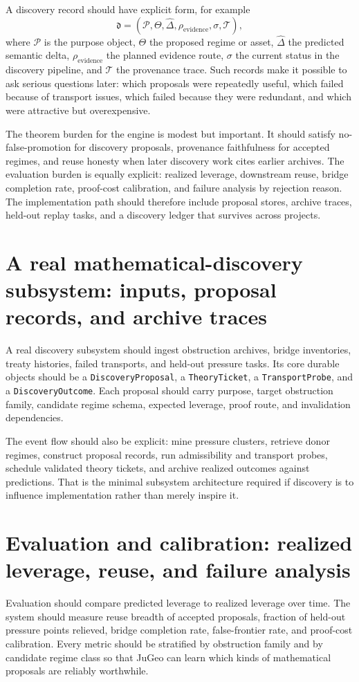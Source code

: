 \documentclass[11pt]{report}
\begin{document}
A discovery record should have explicit form, for example
\[
\mathfrak{d} = (\mathcal{P}, \Theta, \hat{\Delta}, \rho_{\mathrm{evidence}}, \sigma, \mathcal{T}),
\]
where $\mathcal{P}$ is the purpose object, $\Theta$ the proposed regime or asset, $\hat{\Delta}$ the predicted semantic delta, $\rho_{\mathrm{evidence}}$ the planned evidence route, $\sigma$ the current status in the discovery pipeline, and $\mathcal{T}$ the provenance trace. Such records make it possible to ask serious questions later: which proposals were repeatedly useful, which failed because of transport issues, which failed because they were redundant, and which were attractive but overexpensive.

The theorem burden for the engine is modest but important. It should satisfy no-false-promotion for discovery proposals, provenance faithfulness for accepted regimes, and reuse honesty when later discovery work cites earlier archives. The evaluation burden is equally explicit: realized leverage, downstream reuse, bridge completion rate, proof-cost calibration, and failure analysis by rejection reason. The implementation path should therefore include proposal stores, archive traces, held-out replay tasks, and a discovery ledger that survives across projects.
\section{A real mathematical-discovery subsystem: inputs, proposal records, and archive traces}
A real discovery subsystem should ingest obstruction archives, bridge inventories, treaty histories, failed transports, and held-out pressure tasks. Its core durable objects should be a \texttt{DiscoveryProposal}, a \texttt{TheoryTicket}, a \texttt{TransportProbe}, and a \texttt{DiscoveryOutcome}. Each proposal should carry purpose, target obstruction family, candidate regime schema, expected leverage, proof route, and invalidation dependencies.

The event flow should also be explicit: mine pressure clusters, retrieve donor regimes, construct proposal records, run admissibility and transport probes, schedule validated theory tickets, and archive realized outcomes against predictions. That is the minimal subsystem architecture required if discovery is to influence implementation rather than merely inspire it.

\section{Evaluation and calibration: realized leverage, reuse, and failure analysis}
Evaluation should compare predicted leverage to realized leverage over time. The system should measure reuse breadth of accepted proposals, fraction of held-out pressure points relieved, bridge completion rate, false-frontier rate, and proof-cost calibration. Every metric should be stratified by obstruction family and by candidate regime class so that JuGeo can learn which kinds of mathematical proposals are reliably worthwhile.
\end{document}
